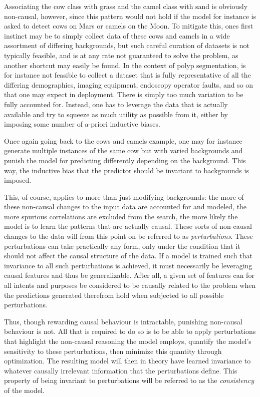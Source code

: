 Associating the cow class with grass and the camel class with sand is obviously non-causal, however, since this pattern would not hold if the model for instance is asked to detect cows on Mars or camels on the Moon. To mitigate this, ones first instinct may be to simply collect data of these cows and camels in a wide assortment of differing backgrounds, but such careful curation of datasets is not typically feasible, and is at any rate not guaranteed to solve the problem, as another shortcut may easily be found. In the context of polyp segmentation, is for instance not feasible to collect a dataset that is fully representative of all the differing demographics, imaging equipment, endoscopy operator faults, and so on that one may expect in deployment.  There is simply too much variation to be fully accounted for. Instead, one has to leverage the data that is actually available and try to squeeze as much utility as possible from it, either by imposing some number of a-priori inductive biases. 

Once again going back to the cows and camels example, one may for instance generate multiple instances of the same cow but with varied backgrounds and punish the model for predicting differently depending on the background. This way, the inductive bias that the predictor should be invariant to backgrounds is imposed. 

This, of course, applies to more than just modifying backgrounds: the more of these non-causal changes to the input data are accounted for and modeled, the more spurious correlations are excluded from the search, the more likely the model is to learn the patterns that are actually causal. These sorts of non-causal changes to the data will from this point on be referred to as \textit{perturbations}. These perturbations can take practically any form, only under the condition that it should not affect the causal structure of the data. If a model is trained such that invariance to all such perturbations is achieved, it must necessarily be leveraging causal features and thus be generalizable. After all, a given set of features can for all intents and purposes be considered to be causally related to the problem when the predictions generated therefrom hold when subjected to all possible perturbations. 

Thus, though rewarding causal behaviour is intractable, punishing non-causal behaviour is not. All that is required to do so is to be able to apply perturbations that highlight the non-causal reasoning the model employs, quantify the model's sensitivity to these perturbations, then minimize this quantity through optimization. The resulting model will then in theory have learned invariance to whatever causally irrelevant information that the perturbations define. This property of being invariant to perturbations will be referred to as the \textit{consistency} of the model. 

